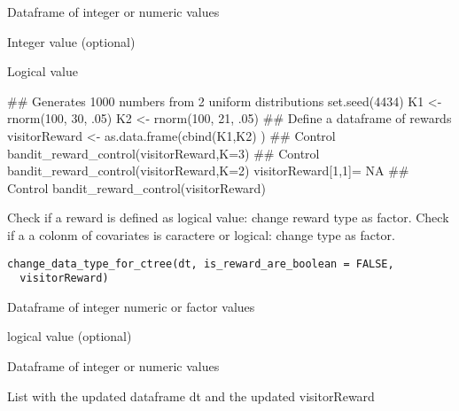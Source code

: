 \documentclass[letterpaper]{book}
\begin{document}
%
\begin{Arguments}
\begin{ldescription}
\item[\code{visitorReward}] Dataframe of integer or numeric values

\item[\code{K}] Integer value (optional)
\end{ldescription}
\end{Arguments}
%
\begin{Value}
Logical value
\end{Value}
%
\begin{Examples}
\begin{ExampleCode}
## Generates 1000 numbers from 2 uniform distributions
set.seed(4434)
K1 <- rnorm(100, 30, .05)
K2 <- rnorm(100, 21, .05)
## Define a dataframe of rewards
visitorReward <- as.data.frame(cbind(K1,K2) )
## Control
bandit_reward_control(visitorReward,K=3)
## Control
bandit_reward_control(visitorReward,K=2)
visitorReward[1,1]= NA
## Control
bandit_reward_control(visitorReward)

\end{ExampleCode}
\end{Examples}
%
\begin{Description}\relax
Check if a reward is defined as logical value: change reward type as factor.
Check if a a colonm of covariates is caractere or logical: change type as factor.
\end{Description}
%
\begin{Usage}
\begin{verbatim}
change_data_type_for_ctree(dt, is_reward_are_boolean = FALSE,
  visitorReward)
\end{verbatim}
\end{Usage}
%
\begin{Arguments}
\begin{ldescription}
\item[\code{dt}] Dataframe of integer numeric or factor values

\item[\code{is\_reward\_are\_boolean}] logical value (optional)

\item[\code{visitorReward}] Dataframe of integer or numeric values
\end{ldescription}
\end{Arguments}
%
\begin{Value}
List with the updated dataframe dt and the updated visitorReward
\end{Value}
\end{document}
